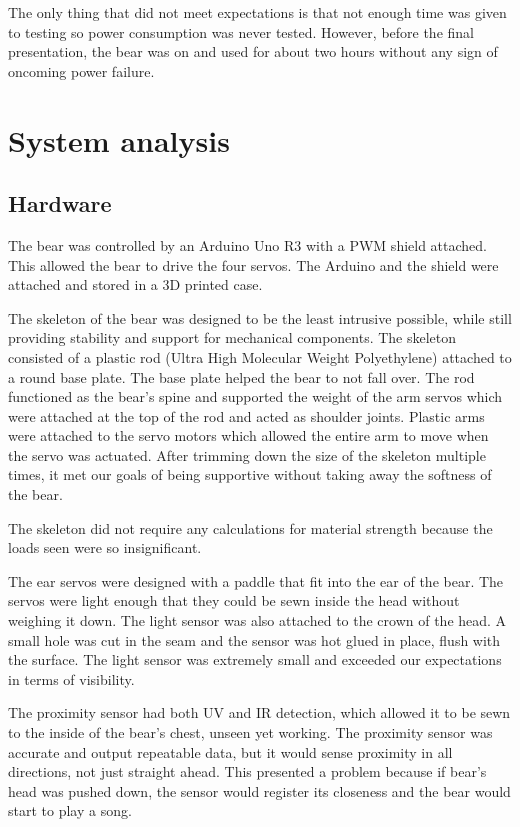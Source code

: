 \documentclass{article}
\begin{document}
The only thing that did not meet expectations is that not enough time was given to testing so power consumption was never tested. However, before the final presentation, the bear was on and used for about two hours without any sign of oncoming power failure.

\section{System analysis}
\subsection{Hardware}
The bear was controlled by an Arduino Uno R3 with a PWM shield attached. This allowed the bear to drive the four servos. The Arduino and the shield were attached and stored in a 3D printed case.

The skeleton of the bear was designed to be the least intrusive possible, while still providing stability and support for mechanical components. The skeleton consisted of a plastic rod (Ultra High Molecular Weight Polyethylene) attached to a round base plate. The base plate helped the bear to not fall over. The rod functioned as the bear's spine and supported the weight of the arm servos which were attached at the top of the rod and acted as shoulder joints. Plastic arms were attached to the servo motors which allowed the entire arm to move when the servo was actuated. After trimming down the size of the skeleton multiple times, it met our goals of being supportive without taking away the softness of the bear.

The skeleton did not require any calculations for material strength because the loads seen were so insignificant.

The ear servos were designed with a paddle that fit into the ear of the bear. The servos were light enough that they could be sewn inside the head without weighing it down. The light sensor was also attached to the crown of the head. A small hole was cut in the seam and the sensor was hot glued in place, flush with the surface. The light sensor was extremely small and exceeded our expectations in terms of visibility.

The proximity sensor had both UV and IR detection, which allowed it to be sewn to the inside of the bear's chest, unseen yet working. The proximity sensor was accurate and output repeatable data, but it would sense proximity in all directions, not just straight ahead. This presented a problem because if bear's head was pushed down, the sensor would register its closeness and the bear would start to play a song.
\end{document}
